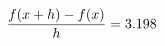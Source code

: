 \documentclass[preview]{standalone}
\begin{document}
\begin{align*}
\special{dvisvgm:raw <g id='unique000'>}\frac{f(x+h)-f(x)}{h} = 3.198\special{dvisvgm:raw </g>}
\end{align*}
\end{document}
